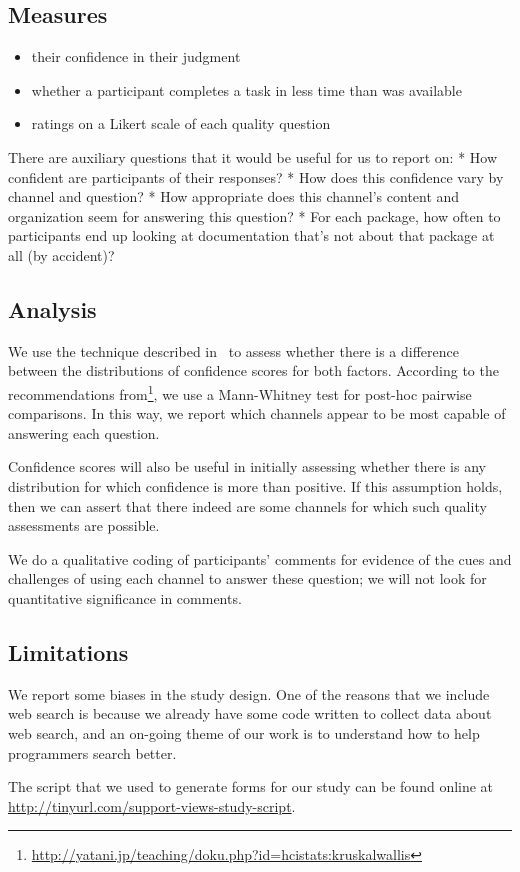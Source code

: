 \subsection{Measures}

\begin{itemize}
\item their confidence in their judgment
\item whether a participant completes a task in less time than was available 
\item ratings on a Likert scale of each quality question
\end{itemize}

There are auxiliary questions that it would be useful for us to report on:
* How confident are participants of their responses?
* How does this confidence vary by channel and question?
* How appropriate does this channel's content and organization seem for answering this question?
* For each package, how often to participants end up looking at documentation that's not about that package at all (by accident)?

\subsection{Analysis}

We use the technique described in~\cite{kaptein_powerful_2010} to assess whether there is a difference between the distributions of confidence scores for both factors.
According to the recommendations from\footnote{\url{http://yatani.jp/teaching/doku.php?id=hcistats:kruskalwallis}}, we use a Mann-Whitney test for post-hoc pairwise comparisons.
In this way, we report which channels appear to be most capable of answering each question.

Confidence scores will also be useful in initially assessing whether there is any distribution for which confidence is more than positive.
If this assumption holds, then we can assert that there indeed are some channels for which such quality assessments are possible.

We do a qualitative coding of participants' comments for evidence of the cues and challenges of using each channel to answer these question; we will not look for quantitative significance in comments.

\subsection{Limitations}

We report some biases in the study design.
One of the reasons that we include web search is because we already have some code written to collect data about web search, and an on-going theme of our work is to understand how to help programmers search better.

The script that we used to generate forms for our study can be found online at \url{http://tinyurl.com/support-views-study-script}.
\fi
